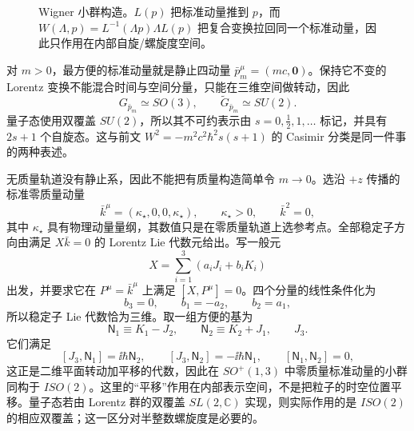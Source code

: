 \begin{figure}[htbp]
 \centering
 
 \caption{Wigner 小群构造。$L(p)$ 把标准动量推到 $p$，而 $W(\Lambda,p)=L^{-1}(\Lambda p)\Lambda L(p)$ 把复合变换拉回同一个标准动量，因此只作用在内部自旋/螺旋度空间。}
 \label{fig:wigner-little-group-dp9}
\end{figure}

对 $m>0$，最方便的标准动量就是静止四动量 $\bar p_m^\mu=(mc,\mathbf0)$。保持它不变的 Lorentz 变换不能混合时间与空间分量，只能在三维空间做转动，因此
\begin{equation}
 \boxed{
 G_{\bar p_m}\simeq SO(3),
 \qquad
 \widetilde G_{\bar p_m}\simeq SU(2).}
 \label{eq:wigner-massive-little-group-dp68}
\end{equation}
量子态使用双覆盖 $SU(2)$，所以其不可约表示由 $s=0,\tfrac12,1,\ldots$ 标记，并具有 $2s+1$ 个自旋态。这与前文 $W^2=-m^2c^2\hbar^2s(s+1)$ 的 Casimir 分类是同一件事的两种表述。

无质量轨道没有静止系，因此不能把有质量构造简单令 $m\to0$。选沿 $+z$ 传播的标准零质量动量
\begin{equation}
 \bar k^\mu=(\kappa_\star,0,0,\kappa_\star),
 \qquad \kappa_\star>0,
 \qquad \bar k^2=0,
 \label{eq:wigner-massless-standard-momentum-dp9}
\end{equation}
其中 $\kappa_\star$ 具有物理动量量纲，其数值只是在零质量轨道上选参考点。全部稳定子方向由满足 $X\bar k=0$ 的 Lorentz Lie 代数元给出。写一般元
\begin{equation*}
 X=\sum_{i=1}^3(a_iJ_i+b_iK_i)
\end{equation*}
出发，并要求它在 $P^\mu=\bar k^\mu$ 上满足 $[X,P^\mu]=0$。四个分量的线性条件化为
\begin{equation*}
 b_3=0,
 \qquad
 b_1=-a_2,
 \qquad
 b_2=a_1,
\end{equation*}
所以稳定子 Lie 代数恰为三维。取一组方便的基为
\begin{equation}
 \mathsf N_1\equiv K_1-J_2,
 \qquad
 \mathsf N_2\equiv K_2+J_1,
 \qquad
 J_3.
 \label{eq:wigner-massless-little-group-generators-dp68}
\end{equation}
它们满足
\begin{equation}
 \boxed{
 [J_3,\mathsf N_1]=\ii\hbar\mathsf N_2,
 \qquad
 [J_3,\mathsf N_2]=-\ii\hbar\mathsf N_1,
 \qquad
 [\mathsf N_1,\mathsf N_2]=0,}
 \label{eq:wigner-massless-little-group-algebra-dp68}
\end{equation}
这正是二维平面转动加平移的代数，因此在 $SO^+(1,3)$ 中零质量标准动量的小群同构于 $ISO(2)$。这里的“平移”作用在内部表示空间，不是把粒子的时空位置平移。量子态若由 Lorentz 群的双覆盖 $SL(2,\mathbb C)$ 实现，则实际作用的是 $ISO(2)$ 的相应双覆盖；这一区分对半整数螺旋度是必要的。

